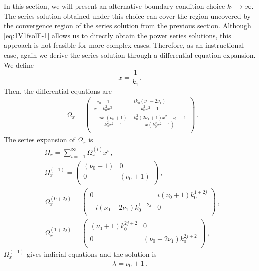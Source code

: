 \documentclass[a4paper,11pt]{article}
\newcommand{\nn}{\nonumber}
\begin{document}
In this section, we will present an alternative boundary condition choice $k_1\to \infty$. The series solution obtained under this choice can cover the region uncovered by the convergence region of the series solution from the previous section.
Although \eqref{eq:1V1fsolF-1} allows us to directly obtain the power series solutions, this approach is not feasible for more complex cases. Therefore, as an instructional case, again we derive the series solution through a differential equation expansion.
We define
\begin{equation}
x=\frac{1}{k_1}.
\end{equation} 
Then, the differential equations are
\begin{align}
&\Omega_x =\left(
\begin{array}{cc}
 \frac{\nu _0+1}{x-k_0^2 x^3} & \frac{i k_0 \left(\nu _0-2 \nu _1\right)}{k_0^2 x^2-1} \\
 -\frac{i k_0 \left(\nu _0+1\right)}{k_0^2 x^2-1} & \frac{k_0^2 \left(2 \nu _1+1\right) x^2-\nu _0-1}{x
   \left(k_0^2 x^2-1\right)} \\
\end{array}
\right)  \,.  \label{eq:DEx1V1fk1inf}
\end{align} 
The series expansion of $\Omega_x$ is
\begin{align}
&\Omega_x = \sum_{i=-1}^\infty \Omega_x^{(i)} x^{i} \,, \nn\\
&\Omega_x^{(-1)}=\left(
\begin{array}{cc}
 \left(\nu _0+1\right) & 0 \\
 0 &\left(\nu_0+1\right) \\
\end{array}
\right)     \,,\nn\\
&\Omega_x^{(0+2j)}=\left(
\begin{array}{cc}
 0 & i  \left(\nu _0+1\right)k_0^{1+2j} \\
 -i \left(\nu_0-2\nu_1\right) k_0^{1+2j} & 0 \\
\end{array}
\right) \,, \nn\\
&\Omega_x^{(1+2j)}=\left(
\begin{array}{cc}
 \left(\nu _0+1\right) k_0^{2j+2} & 0 \\
 0 &\left(\nu_0-2\nu_1\right) k_0^{2j+2} \\
\end{array}
\right)     \,,
\end{align}
$\Omega_x^{(-1)}$ gives indicial equations and the solution is
\begin{align}
\lambda=\nu_0+1 \,.
\end{align}
\end{document}
